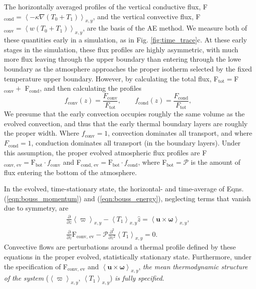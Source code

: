\documentclass[aps, pre, onecolumn, nofootinbib, notitlepage, groupedaddress, amsfonts, amssymb, amsmath, longbibliography]{revtex4-1}
\newcommand{\angles}[1]{\ensuremath{\left\langle #1 \right\rangle}}
\newcommand{\grad}{\ensuremath{\nabla}}
\begin{document}
The horizontally averaged profiles of the vertical conductive flux, 
F$_{\text{cond}} = \angles{-\kappa\grad(T_0 + T_1)}_{x,y}$, and the vertical convective flux,
F$_{\text{conv}} = \angles{w(T_0 + T_1)}_{x,y}$, are the basis of the AE method. We measure
both of these quantities early in a simulation, as in Fig. \ref{fig:time_trace}c.
At these early stages in the simulation, these flux profiles are highly asymmetric,
with much more flux leaving through the upper boundary than entering through the
lowe boundary as the atmosphere approaches the proper isotherm selected by the
fixed temperature upper boundary.
However, by calculating the total flux,
F$_{\text{tot}} = $F$_{\text{conv}} +$ F$_{\text{cond}}$, and then calculating the profiles
\begin{equation}
f_{\text{conv}}(z) = \frac{F_{\text{conv}}}{F_{\text{tot}}},\qquad
f_{\text{cond}}(z) = \frac{F_{\text{cond}}}{F_{\text{tot}}},
\label{eqn:bvp_ratios}
\end{equation}
We presume that the early convection occupies roughly the same volume as the evolved
convection, and thus that the early thermal boundary layers are roughly the proper
width.  Where $f_{\text{conv}} = 1$, convection dominates all transport, and where
$F_{\text{cond}} = 1$, conduction dominates all transport (in the boundary
layers). Under this assumption, the proper evolved atmospheric flux profiles
are F$_{\text{conv, ev}} = \text{F}_{\text{bot}}\cdot f_{\text{conv}}$
and F$_{\text{cond, ev}} = \text{F}_{\text{bot}}\cdot f_{\text{cond}}$,
where F$_{\text{bot}} = \mathcal{P}$ is the amount of flux entering the
bottom of the atmosphere.

In the evolved, time-stationary state, the horizontal- and time-average of
Eqns. (\ref{eqn:bouss_momentum}) and (\ref{eqn:bouss_energy}), neglecting terms that
vanish due to symmetry, are
\begin{gather}
\frac{\partial}{\partial z}\angles{\varpi}_{x,y} - \angles{T_1}_{x,y}\hat{z} = \angles{\bm{u}\times\bm{\omega}}_{x,y},
	\label{eqn:bouss_BVP_momentum}
\\
\frac{\partial}{\partial z}\text{F}_{\text{conv, ev}} - \mathcal{P}\frac{\partial^2}{\partial z^2} \angles{T_1}_{x,y} = 0.
	\label{eqn:bouss_BVP_energy}
\end{gather}
Convective flows
are perturbations around a thermal profile defined by these equations in the proper evolved, 
statistically stationary state. Furthermore, under the specification of
F$_{\text{conv, ev}}$ and $\angles{\bm{u}\times\bm{\omega}}_{x,y}$,
\emph{the mean thermodynamic structure of the system} ($\angles{\varpi}_{x,y},\,\angles{T_1}_{x,y}$)
\emph{is fully specified}.
\end{document}

